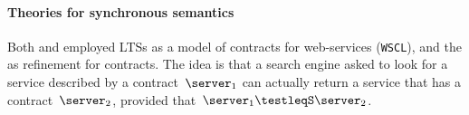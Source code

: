 





\paragraph{Theories for synchronous semantics}
Both \cite{DBLP:conf/concur/LaneveP07} and
\cite{DBLP:journals/toplas/CastagnaGP09} employed LTSs as a model of
contracts for web-services (\ie \texttt{WSCL}), and the \mustpreorder
as refinement for contracts.  The idea is that a search engine asked
to look for a service described by a contract~$\server_1$ can
actually return a service that has a contract~$\server_2$, provided
that~$\server_1 \testleqS \server_2$.

